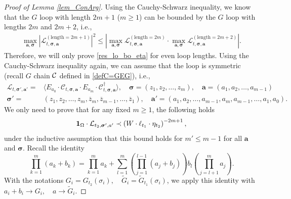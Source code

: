 \documentclass[10pt,reqno]{article}
\renewcommand{\bar}{\overline}
\theoremstyle{plain} %
\theoremstyle{remark}
\numberwithin{equation}{section}
\begin{document}
 
\begin{proof}[Proof of Lemma \ref{lem_ConArg}]
Using the Cauchy-Schwarz inequality, we know that the $G$ loop with length $2m+1$ ($m\ge 1$) can be bounded by the $G$ loop with lengths $2m$ and $2m+2$, i.e.,
\begin{align}\label{adummzps}
    \max_{\textbf{a}, \boldsymbol{\sigma}} \left|\mathcal{L}^{(\text{length} = 2m+1)}_{t, \boldsymbol{\sigma}, \textbf{a}}\right|^2 \le \left|\max_{\textbf{a}, \boldsymbol{\sigma}} \mathcal{L}^{(\text{length} = 2m)}_{t, \boldsymbol{\sigma}, \textbf{a}} \cdot \max_{\textbf{a}, \boldsymbol{\sigma}} \mathcal{L}^{(\text{length} = 2m+2)}_{t, \boldsymbol{\sigma}, \textbf{a}}\right|.  
  \end{align}
Therefore, we will only prove \eqref{res_lo_bo_eta} for even loop lengths. Using the Cauchy-Schwarz inequality again, we can assume that the loop is symmetric (recall $G$ chain $\cal C$ defined in \eqref{defC=GEG}), i.e., 
\begin{align}\label{sym_calL}
        \mathcal{L}_{t, \boldsymbol{\sigma}', \textbf{a}'} = & \langle E_{a_0} \cdot \mathcal{C}_{t, \boldsymbol{\sigma}, \textbf{a}} \cdot E_{a_m} \cdot \mathcal{C}^\dagger_{t, \boldsymbol{\sigma}, \textbf{a}} \rangle, \quad \boldsymbol{\sigma} = (z_1, z_2, \ldots, z_m), \quad \textbf{a} = (a_1, a_2, \ldots, a_{m-1}) \nonumber \\
 \boldsymbol{\sigma}' = & (z_1, z_2, \ldots, z_m, \bar{z}_m, \bar{z}_{m-1}, \ldots, \bar{z}_1), \quad \textbf{a}' = ( a_1, a_2, \ldots, a_{m-1}, a_m, a_{m-1}, \ldots, a_1, a_0).
\end{align}
We only need to prove that for any fixed $m\ge 1$, the following holds 
\begin{equation}\label{eq_main_ConAr}
        {\bf 1}_{\Omega}\cdot  \mathcal{L}_{t_2, \boldsymbol{\sigma}', \textbf{a}'}
        \prec
        \left( W \cdot \ell_{t_1}\cdot \eta_{t_2} \right)^{-2m+1},
\end{equation}
under the inductive assumption that this bound holds for $  m' \le m-1$  for all $\textbf{a}$ and $\boldsymbol{\sigma}$.
Recall  the identity 
\begin{equation}\label{abform1}
        \prod_{k=1}^m (a_k + b_k) = \prod_{k=1}^m a_k + \sum_{l=1}^m \left(\prod_{j=1}^{l-1} (a_j + b_j)\right) b_l \left(\prod_{j=l+1}^m a_j\right). 
\end{equation}
With the notations $ G_i = G_{t_2}(\sigma_i), \quad \widetilde{G}_i = {\widetilde G}_{t_1}(\sigma_i)$, 
we apply this identity with $  a_i+b_i\to G_i,\quad a\to \widetilde{G}_i$.

\end{proof}
\end{document}

